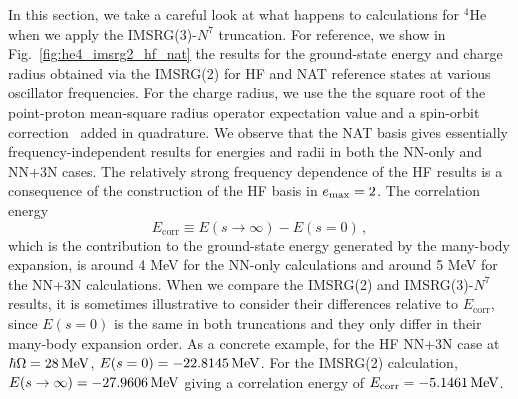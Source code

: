 In this section,
we take a careful look at what happens to calculations for ${}^{4}\text{He}$
when we apply the IMSRG(3)-$N^7$ truncation.
For reference, we show in Fig.~\ref{fig:he4_imsrg2_hf_nat}
the results for the ground-state energy and charge radius
obtained via the IMSRG(2) for HF and NAT reference states
at various oscillator frequencies.
For the charge radius,
we use the
the square root
of the point-proton mean-square radius operator expectation value
and a spin-orbit correction~\cite{Ong10radius_spin_orbit}
added in quadrature.
We observe that the NAT basis
gives essentially frequency-independent results
for energies and radii
in both the NN-only and NN+3N cases.
The relatively strong frequency dependence
of the HF results is a consequence
of the construction of the HF basis in $e_{\text{max}}=2$.
The correlation energy
\begin{equation}
    E_{\text{corr}}\equiv E(s \rightarrow \infty) - E(s=0)\,,
\end{equation}
which is the contribution to the ground-state energy generated
by the many-body expansion,
is around 4 MeV for the NN-only calculations
and around 5 MeV for the NN+3N calculations.
When we compare the IMSRG(2) and IMSRG(3)-$N^7$ results,
it is sometimes illustrative to consider
their differences relative to $E_{\text{corr}}$,
since $E(s=0)$ is the same in both truncations
and they only differ in their many-body expansion order.
As a concrete example,
for the HF NN+3N case at $\hbar \Omega = 28\, \text{MeV}$,
$E(s=0) = -22.8145\, \text{MeV}$.
For the IMSRG(2) calculation,
$E(s \rightarrow \infty) = -27.9606\, \text{MeV}$
giving a correlation energy of
$E_{\text{corr}} = -5.1461\, \text{MeV}$.

